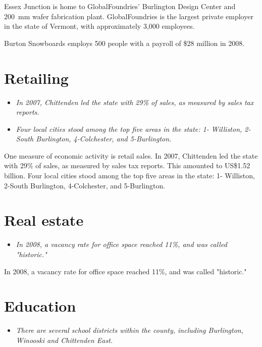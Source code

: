 Essex Junction is home to GlobalFoundries' Burlington Design Center and
200~mm wafer fabrication plant. GlobalFoundries is the largest private
employer in the state of Vermont, with approximately 3,000 employees.

Burton Snowboards employs 500 people with a payroll of \$28 million in
2008.

\section{Retailing}\label{retailing}

\begin{itemize}
\item
  \emph{In 2007, Chittenden led the state with 29\% of sales, as
  measured by sales tax reports.}
\item
  \emph{Four local cities stood among the top five areas in the state:
  1- Williston, 2-South Burlington, 4-Colchester, and 5-Burlington.}
\end{itemize}

One measure of economic activity is retail sales. In 2007, Chittenden
led the state with 29\% of sales, as measured by sales tax reports. This
amounted to US\$1.52 billion. Four local cities stood among the top five
areas in the state: 1- Williston, 2-South Burlington, 4-Colchester, and
5-Burlington.

\section{Real estate}\label{real-estate}

\begin{itemize}
\item
  \emph{In 2008, a vacancy rate for office space reached 11\%, and was
  called "historic."}
\end{itemize}

In 2008, a vacancy rate for office space reached 11\%, and was called
"historic."

\section{Education}\label{education}

\begin{itemize}
\item
  \emph{There are several school districts within the county, including
  Burlington, Winooski and Chittenden East.}
\end{itemize}

